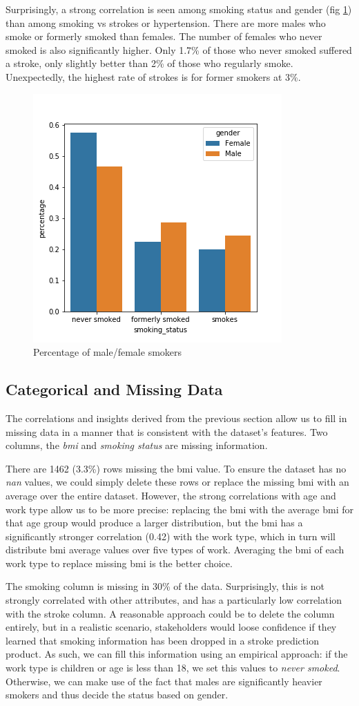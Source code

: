 \documentclass[proposal]{softeng}
\begin{document}
Surprisingly, a strong correlation is seen among smoking status and gender (fig \ref{fig:gender_smoking_percentage}) than among  smoking vs strokes or hypertension. There are more males who smoke or formerly smoked than females. The number of females who never smoked is also significantly higher. Only 1.7\% of those who never smoked suffered a stroke, only slightly better than 2\% of those who regularly smoke. Unexpectedly, the highest rate of strokes is for former smokers at 3\%.

\begin{figure}[h!]
\centering
  \includegraphics[width=.4\textwidth]{images/building_ann/gender_smoking_percentage.png}
  \caption{Percentage of male/female smokers}
  \label{fig:gender_smoking_percentage}
\end{figure}

\subsection{Categorical and Missing Data}
The correlations and insights derived from the previous section allow us to fill in missing data in a manner that is consistent with the dataset's features. Two columns, the \textit{bmi} and \textit{smoking status} are missing information.

There are 1462 (3.3\%) rows missing the bmi value. To ensure the dataset has no \textit{nan} values, we could simply delete these rows or replace the missing bmi with an average over the entire dataset. However, the strong correlations with age and work type allow us to be more precise: replacing the bmi with the average bmi for that age group would produce a larger distribution, but the bmi has a significantly stronger correlation (0.42) with the work type, which in turn will distribute bmi average values over five types of work. Averaging the bmi of each work type to replace missing bmi is the better choice.

The smoking column is missing in 30\% of the data. Surprisingly, this is not strongly correlated with other attributes, and has a particularly low correlation with the stroke column. A reasonable approach could be to delete the column entirely, but in a realistic scenario, stakeholders would loose confidence if they learned that smoking information has been dropped in a stroke prediction product. As such, we can fill this information using an empirical approach: if the work type is children or age is less than 18, we set this values to\textit{ never smoked}. Otherwise, we can make use of the fact that males are significantly heavier smokers and thus decide the status based on gender.
\end{document}
